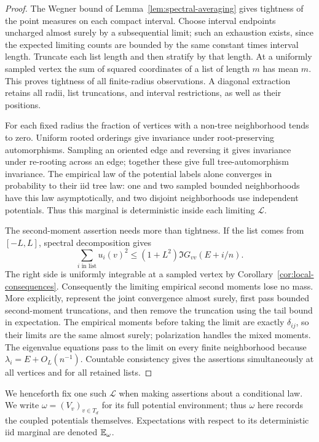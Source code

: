 \begin{proof}
The Wegner bound of Lemma~\ref{lem:spectral-averaging} gives tightness
of the point measures on each compact interval.  Choose interval
endpoints uncharged almost surely by a subsequential limit; such an
exhaustion exists, since the expected limiting counts are bounded by
the same constant times interval length.  Truncate each list length
and then stratify by that length.  At a uniformly sampled vertex the
sum of squared coordinates of a list of length \(m\) has mean \(m\).
This proves tightness of all finite-radius observations.  A diagonal
extraction retains all radii, list truncations, and interval
restrictions, as well as their positions.

For each fixed radius the fraction of vertices with a non-tree
neighborhood tends to zero.  Uniform rooted orderings give invariance
under root-preserving automorphisms.  Sampling an oriented edge and
reversing it gives invariance under re-rooting across an edge; together
these give full tree-automorphism invariance.  The empirical law of
the potential labels alone converges in probability to their iid
tree law: one and two sampled bounded neighborhoods have this law
asymptotically, and two disjoint neighborhoods use independent
potentials.  Thus this marginal is deterministic inside each
limiting \(\mathcal L\).

The second-moment assertion needs more than tightness.  If the list
comes from \([-L,L]\), spectral decomposition gives
\begin{equation}\label{eq:marks-dominated-by-resolvent}
 \sum_{i\text{ in list}}u_i(v)^2
 \le (1+L^2)\Im G_{vv}(E+i/n).
\end{equation}
The right side is uniformly integrable at a sampled vertex by
Corollary~\ref{cor:local-consequences}.  Consequently the limiting
empirical second moments lose no mass.  More explicitly, represent
the joint convergence almost surely, first pass bounded
second-moment truncations, and then remove the truncation using the
tail bound in expectation.  The empirical moments before taking the
limit are exactly \(\delta_{ij}\), so their limits are the same almost
surely; polarization handles the mixed moments.  The eigenvalue
equations pass to the limit on every finite neighborhood because
\(\lambda_i=E+O_L(n^{-1})\).  Countable consistency gives the assertions
simultaneously at all vertices and for all retained lists.
\end{proof}

We henceforth fix one such \(\mathcal L\) when making assertions about
a conditional law.  We write \(\omega=(V_v)_{v\in T_d}\) for its full
potential environment; thus \(\omega\) here records the coupled
potentials themselves.  Expectations with respect to its deterministic
iid marginal are denoted \(\mathbb E_\omega\).

